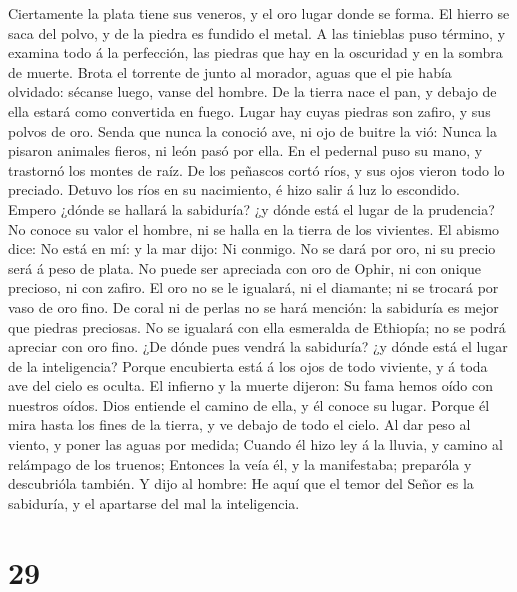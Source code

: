  Ciertamente la plata tiene sus veneros, y el oro lugar
donde se forma.  El hierro se saca del polvo, y de la piedra
es fundido el metal.  A las tinieblas puso término, y
examina todo á la perfección, las piedras que hay en la oscuridad y en
la sombra de muerte.  Brota el torrente de junto al morador,
aguas que el pie había olvidado: sécanse luego, vanse del hombre.
 De la tierra nace el pan, y debajo de ella estará como
convertida en fuego.  Lugar hay cuyas piedras son zafiro, y
sus polvos de oro.  Senda que nunca la conoció ave, ni ojo
de buitre la vió:  Nunca la pisaron animales fieros, ni león
pasó por ella.  En el pedernal puso su mano, y trastornó los
montes de raíz.  De los peñascos cortó ríos, y sus ojos
vieron todo lo preciado.  Detuvo los ríos en su nacimiento,
é hizo salir á luz lo escondido.  Empero ¿dónde se hallará
la sabiduría? ¿y dónde está el lugar de la prudencia?  No
conoce su valor el hombre, ni se halla en la tierra de los vivientes.
 El abismo dice: No está en mí: y la mar dijo: Ni conmigo.
 No se dará por oro, ni su precio será á peso de plata.
 No puede ser apreciada con oro de Ophir, ni con onique
precioso, ni con zafiro.  El oro no se le igualará, ni el
diamante; ni se trocará por vaso de oro fino.  De coral ni
de perlas no se hará mención: la sabiduría es mejor que piedras
preciosas.  No se igualará con ella esmeralda de Ethiopía;
no se podrá apreciar con oro fino.  ¿De dónde pues vendrá
la sabiduría? ¿y dónde está el lugar de la inteligencia? 
Porque encubierta está á los ojos de todo viviente, y á toda ave del
cielo es oculta.  El infierno y la muerte dijeron: Su fama
hemos oído con nuestros oídos.  Dios entiende el camino de
ella, y él conoce su lugar.  Porque él mira hasta los fines
de la tierra, y ve debajo de todo el cielo.  Al dar peso al
viento, y poner las aguas por medida;  Cuando él hizo ley á
la lluvia, y camino al relámpago de los truenos;  Entonces
la veía él, y la manifestaba; preparóla y descubrióla también.
 Y dijo al hombre: He aquí que el temor del Señor es la
sabiduría, y el apartarse del mal la inteligencia.

\hypertarget{section-28}{%
\section{29}\label{section-28}}


